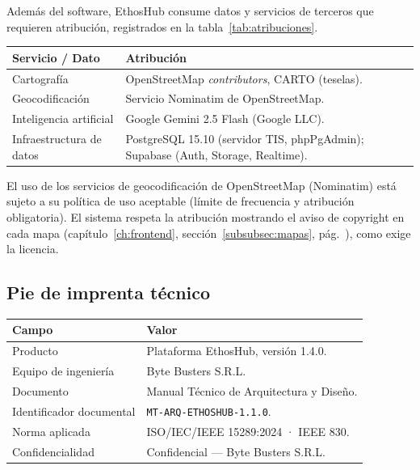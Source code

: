 Además del software, EthosHub consume datos y servicios de terceros que requieren
atribución, registrados en la tabla~\ref{tab:atribuciones}.

\vspace{0.2cm}
\noindent
\renewcommand{\arraystretch}{1.3}
\fontsize{8.5}{10.2}\selectfont\sffamily
\begin{tabularx}{\textwidth}{|L{3.6cm}|Y|}
\hline
{}
\sffamily\textbf{Servicio / Dato} & \sffamily\textbf{Atribución} \\
\hline
Cartografía & \textcopyright{} OpenStreetMap \textit{contributors}, \textcopyright{} CARTO (teselas). \\ \hline
{}
Geocodificación & Servicio Nominatim de OpenStreetMap. \\ \hline
Inteligencia artificial & Google Gemini 2.5 Flash (Google LLC). \\ \hline
{}
Infraestructura de datos & PostgreSQL 15.10 (servidor TIS, phpPgAdmin); Supabase (Auth, Storage, Realtime). \\ \hline
\end{tabularx}
\label{tab:atribuciones}

\begin{AlertaSeguridad}
El uso de los servicios de geocodificación de OpenStreetMap (Nominatim) está sujeto a su
política de uso aceptable (límite de frecuencia y atribución obligatoria). El sistema
respeta la atribución mostrando el aviso de copyright en cada mapa
(capítulo~\ref{ch:frontend}, sección~\ref{subsubsec:mapas},
pág.~\pageref{subsubsec:mapas}), como exige la licencia.
\end{AlertaSeguridad}

\clearpage
\subsection{Pie de imprenta técnico}
\label{subsec:imprenta}

\noindent
\renewcommand{\arraystretch}{1.4}
\fontsize{9}{10.8}\selectfont\sffamily
\begin{tabularx}{\textwidth}{|L{4.0cm}|Y|}
\hline
{}
\sffamily\textbf{Campo} & \sffamily\textbf{Valor} \\
\hline
Producto & Plataforma EthosHub, versión 1.4.0. \\ \hline
{}
Equipo de ingeniería & Byte Busters S.R.L. \\ \hline
Documento & Manual Técnico de Arquitectura y Diseño. \\ \hline
{}
Identificador documental & \texttt{MT-ARQ-ETHOSHUB-1.1.0}. \\ \hline
Norma aplicada & ISO/IEC/IEEE 15289:2024 · IEEE 830. \\ \hline
{}
Confidencialidad & Confidencial — Byte Busters S.R.L. \\ \hline
\end{tabularx}

